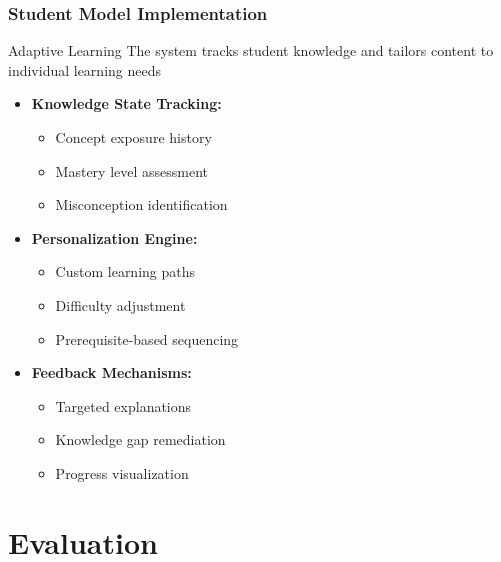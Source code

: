 \documentclass{beamer}
\begin{document}
\begin{frame}
\frametitle{Student Model Implementation}

\begin{block}{Adaptive Learning}
The system tracks student knowledge and tailors content to individual learning needs
\end{block}

\begin{itemize}
    \item<1-> \textbf{Knowledge State Tracking:}
    \begin{itemize}
        \item Concept exposure history
        \item Mastery level assessment
        \item Misconception identification
    \end{itemize}
    \item<2-> \textbf{Personalization Engine:}
    \begin{itemize}
        \item Custom learning paths
        \item Difficulty adjustment
        \item Prerequisite-based sequencing
    \end{itemize}
    \item<3-> \textbf{Feedback Mechanisms:}
    \begin{itemize}
        \item Targeted explanations
        \item Knowledge gap remediation
        \item Progress visualization
    \end{itemize}
\end{itemize}
\end{frame}

\section{Evaluation}
\end{document}
